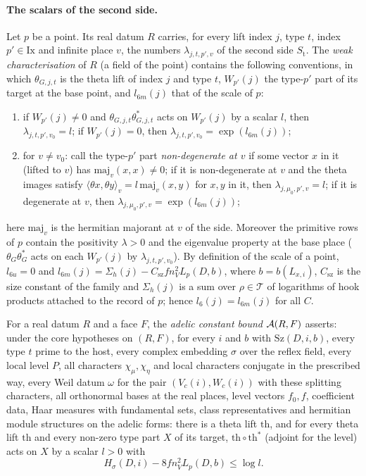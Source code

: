 \paragraph{The scalars of the second side.}
Let $p$ be a point. Its real datum $R$ carries, for every lift index $j$, type $t$, index $p'\in\mathrm{Ix}$ and
infinite place $v$, the numbers $\lambda_{j,t,p',v}$ of the second side $S_{\mathrm t}$. The \emph{weak
characterisation} of $R$ (a field of the point) contains the following conventions, in which $\theta_{G,j,t}$ is the
theta lift of index $j$ and type $t$, $W_{p'}(j)$ the type-$p'$ part of its target at the base point, and $l_{6m}(j)$
that of the scale of $p$:
\begin{enumerate}[label=(\alph*)]
\item if $W_{p'}(j)\ne0$ and $\theta_{G,j,t}\theta_{G,j,t}^*$ acts on $W_{p'}(j)$ by a scalar $l$, then
$\lambda_{j,t,p',v_0}=l$; if $W_{p'}(j)=0$, then $\lambda_{j,t,p',v_0}=\exp(l_{6m}(j))$;
\item for $v\ne v_0$: call the type-$p'$ part \emph{non-degenerate at $v$} if some vector $x$ in it (lifted to $v$)
has $\mathrm{maj}_v(x,x)\ne0$; if it is non-degenerate at $v$ and the theta images satisfy
$\langle\theta x,\theta y\rangle_v=l\,\mathrm{maj}_v(x,y)$ for $x,y$ in it, then $\lambda_{j,\mu_0,p',v}=l$; if it is
degenerate at $v$, then $\lambda_{j,\mu_0,p',v}=\exp(l_{6m}(j))$;
\end{enumerate}
here $\mathrm{maj}_v$ is the hermitian majorant at $v$ of the side. Moreover the primitive rows of $p$ contain the
positivity $\lambda>0$ and the eigenvalue property at the base place ($\theta_G\theta_G^*$ acts on each $W_{p'}(j)$
by $\lambda_{j,t,p',v_0}$). By definition of the scale of a point, $l_{6u}=0$ and
$l_{6m}(j)=\Sigma_h(j)-C_{\mathrm{sz}}fn_V^2L_p(D,b)$, where $b=b(L_{x,i})$, $C_{\mathrm{sz}}$ is the size constant
of the family and $\Sigma_h(j)$ is a sum over $\rho\in\mathcal T$ of logarithms of hook products attached to the
record of $p$; hence $l_6(j)=l_{6m}(j)$ for all $C$.

\begin{definition}\label{pf:onto3:adelcdef}
For a real datum $R$ and a face $F$, the \emph{adelic constant bound} $\mathcal{A}(R,F)$ asserts: under the core
hypotheses on $(R,F)$, for every $i$ and $b$ with $\mathrm{Sz}(D,i,b)$, every type $t$ prime to the host, every
complex embedding $\sigma$ over the reflex field, every local level $P$, all characters $\chi_\mu,\chi_\eta$ and
local characters conjugate in the prescribed way, every Weil datum $\omega$ for the pair $(V_c(i),W_c(i))$ with
these splitting characters, all orthonormal bases at the real places, level vectors $f_0,f$, coefficient data,
Haar measures with fundamental sets, class representatives and hermitian module structures on the adelic forms:
there is a theta lift $\mathrm{th}$, and for every theta lift $\mathrm{th}$ and every non-zero type part $X$ of its
target, $\mathrm{th}\circ\mathrm{th}^*$ (adjoint for the level) acts on $X$ by a scalar $l>0$ with
\[
H_\sigma(D,i)-8fn_V^2L_p(D,b)\le\log l .
\]
\end{definition}

